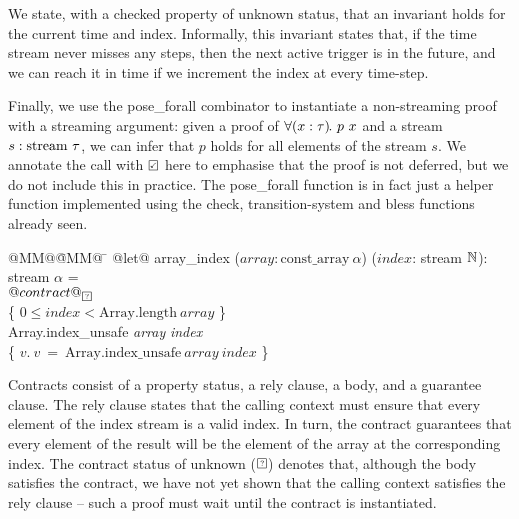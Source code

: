 We state, with a checked property of unknown status, that an invariant holds for the current time and index.
Informally, this invariant states that, if the time stream never misses any steps, then the next active trigger is in the future, and we can reach it in time if we increment the index at every time-step.

Finally, we use the pose_forall combinator to instantiate a non-streaming proof with a streaming argument: given a proof of $\forall (x: \tau)\hspace{-0.1em}.~p~x$ and a stream $s: \text{stream}~{\tau}$, we can infer that $p$ holds for all elements of the stream $s$.
We annotate the call with $\PSValid$ here to emphasise that the proof is not deferred, but we do not include this in practice.
The pose_forall function is in fact just a helper function implemented using the check, transition-system and bless functions already seen.


\begin{tabbing}
  @MM@\= @MM@ \= \kill
  @let@ array_index ($\textit{array}: \mbox{const_array}~\alpha$) ($\textit{index}$: stream $\mathbb{N}$): stream $\alpha$ = \\
  \> $@contract@_{\PSUnknown}$ \\
  \> \> \{ $0 \le \textit{index} < \mbox{Array.length}~\textit{array}$ \} \\
  \> \> Array.index_unsafe \textit{array} \textit{index} \\
  \> \> \{ $v.~v~=~\mbox{Array.index_unsafe}~\textit{array}~\textit{index}$ \} \\
\end{tabbing}

Contracts consist of a property status, a rely clause, a body, and a guarantee clause.
The rely clause states that the calling context must ensure that every element of the index stream is a valid index.
In turn, the contract guarantees that every element of the result will be the element of the array at the corresponding index.
The contract status of unknown ($\PSUnknown$) denotes that, although the body satisfies the contract, we have not yet shown that the calling context satisfies the rely clause -- such a proof must wait until the contract is instantiated.




